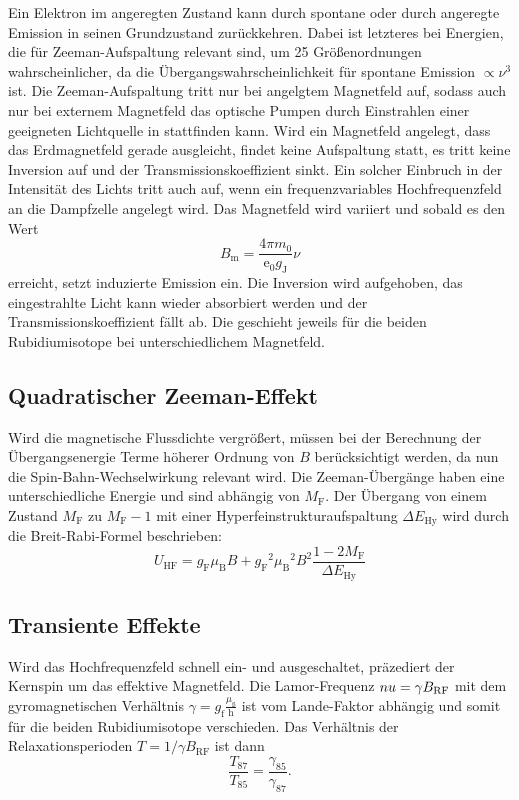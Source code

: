 Ein Elektron im angeregten Zustand kann durch spontane oder durch angeregte Emission in seinen Grundzustand zurückkehren.
Dabei ist letzteres bei Energien, die für Zeeman-Aufspaltung relevant sind, um 25 Größenordnungen wahrscheinlicher, da die
Übergangswahrscheinlichkeit für spontane Emission $\propto \nu^3$ ist.
Die Zeeman-Aufspaltung tritt nur bei angelgtem Magnetfeld auf, sodass auch nur bei externem Magnetfeld das optische Pumpen
durch Einstrahlen einer geeigneten Lichtquelle in stattfinden kann. Wird ein Magnetfeld angelegt, dass das Erdmagnetfeld gerade ausgleicht, findet keine Aufspaltung statt,
es tritt keine Inversion auf und der Transmissionskoeffizient sinkt.
Ein solcher Einbruch in der Intensität des Lichts tritt auch auf, wenn ein frequenzvariables Hochfrequenzfeld an die
Dampfzelle angelegt wird. Das Magnetfeld wird variiert und sobald es den Wert
\begin{equation}
  B_\text{m} = \frac{4\pi m_0}{\text{e}_0g_\text{J}}\nu
\end{equation}
erreicht, setzt induzierte Emission ein. Die Inversion wird aufgehoben, das eingestrahlte Licht kann wieder absorbiert werden
und der Transmissionskoeffizient fällt ab. Die geschieht jeweils für die beiden Rubidiumisotope bei unterschiedlichem
Magnetfeld.

\subsection{Quadratischer Zeeman-Effekt}

Wird die magnetische Flussdichte vergrößert, müssen bei der Berechnung der Übergangsenergie Terme höherer Ordnung von $B$
berücksichtigt werden, da nun die Spin-Bahn-Wechselwirkung relevant wird. Die Zeeman-Übergänge haben eine unterschiedliche
Energie und sind abhängig von $M_\text{F}$. Der Übergang von einem Zustand $M_\text{F}$ zu $M_\text{F}-1$ mit einer
Hyperfeinstrukturaufspaltung $\Delta E_\text{Hy}$ wird durch die Breit-Rabi-Formel beschrieben:
\begin{equation}
  U_\text{HF} = g_\text{F}\mu_\text{B}B + {g_\text{F}}^2{\mu_\text{B}}^2B^2\frac{1-2M_\text{F}}{\Delta E_\text{Hy}}
\end{equation}

\subsection{Transiente Effekte}

Wird das Hochfrequenzfeld schnell ein- und ausgeschaltet, präzediert der Kernspin um das effektive Magnetfeld. Die
Lamor-Frequenz $\\nu = \gamma B_\text{RF}$ mit dem gyromagnetischen Verhältnis $\gamma = g_\text{f}\frac{\mu_ß}{\text{h}}$
ist vom Lande-Faktor abhängig und somit für die beiden Rubidiumisotope verschieden. Das Verhältnis der Relaxationsperioden
$T = 1/\gamma B_\text{RF}$ ist dann
\begin{equation}
  \frac{T_{87}}{T_{85}} = \frac{\gamma_{85}}{\gamma_{87}}.
\end{equation}
